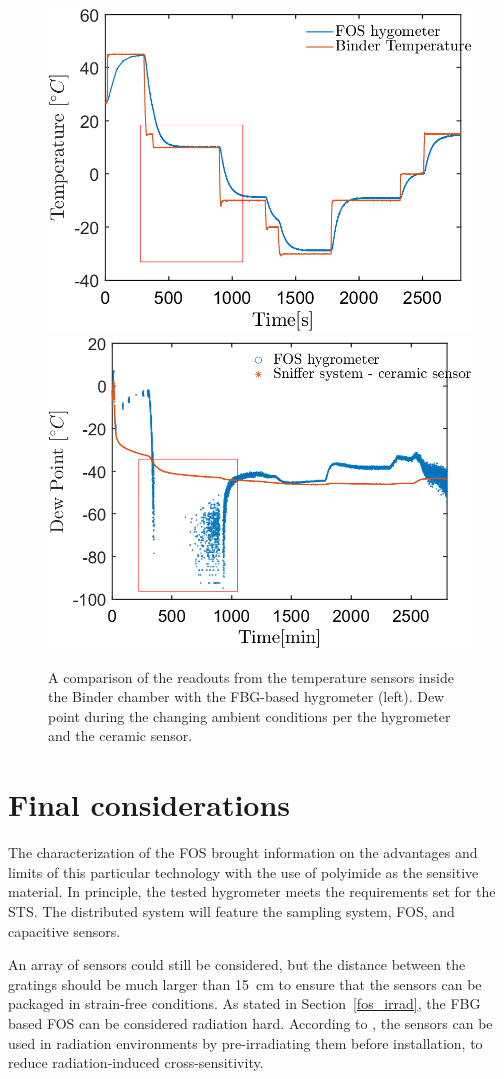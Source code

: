 \begin{figure}[!h]
\centering
\includegraphics[width=0.47\columnwidth]{Chapter5/images/FOS_performance_T.png}
\includegraphics[width=0.49\columnwidth]{Chapter5/images/FOS_performance1.png}
\caption{A comparison of the readouts from the temperature sensors inside the Binder chamber with the \gls{FBG}-based hygrometer (left). Dew point during the changing ambient conditions per the hygrometer and the ceramic sensor.}
\label{Tfig_comparison_2}
\end{figure}
\newpage
\section{Final considerations}

The characterization of the \gls{FOS} brought information on the advantages and limits of this particular technology with the use of polyimide as the sensitive material. In principle, the tested hygrometer meets the requirements set for the \gls{STS}. The distributed system will feature the sampling system, \gls{FOS}, and capacitive sensors.

An array of sensors could still be considered, but the distance between the gratings should be much larger than \SI{15}{\cm} to ensure that the sensors can be packaged in strain-free conditions. As stated in Section~\ref{fos_irrad}, the \gls{FBG} based \gls{FOS} can be considered radiation hard. According to \cite{Berruti}, the sensors can be used in radiation environments by pre-irradiating them before installation, to reduce radiation-induced cross-sensitivity. 

